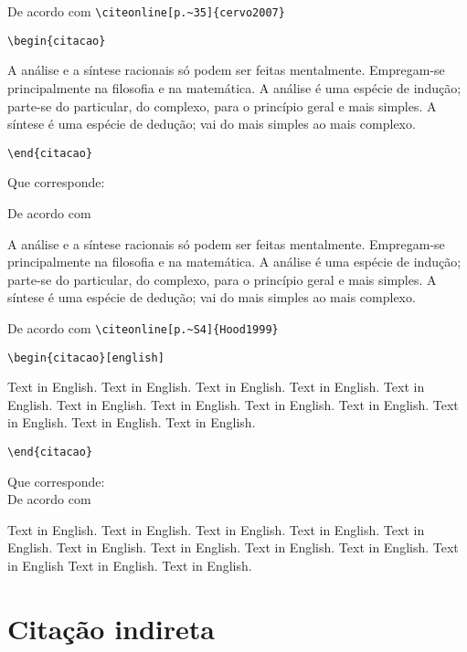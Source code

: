 \begin{alineas} 

\item 
De acordo com \verb+\citeonline[p.~35]{cervo2007}+

\verb+\begin{citacao}+

A análise e a síntese racionais só podem ser feitas mentalmente. Empregam-se principalmente na filosofia e na matemática. A análise é uma espécie de indução; parte-se do particular, do complexo, para o princípio geral e mais simples. A síntese é uma espécie de dedução; vai do mais simples ao mais complexo.

\verb+\end{citacao}+

Que corresponde: 

De acordo com 

\begin{citacao}
A análise e a síntese racionais só podem ser feitas mentalmente. Empregam-se principalmente na filosofia e na matemática. A análise é uma espécie de indução; parte-se do particular, do complexo, para o princípio geral e mais simples. A síntese é uma espécie de dedução; vai do mais simples ao mais complexo.
\end{citacao}

\item
De acordo com \verb+\citeonline[p.~S4]{Hood1999}+

\verb+\begin{citacao}[english]+

Text in English. Text in English. Text in English. Text in
English. Text in English. Text in English. Text in English. 
Text in English. Text in English. Text in English. Text in
English. Text in English.

\verb+\end{citacao}+

Que corresponde: \\

 De acordo com 
\begin{citacao}[english]
	Text in English. Text in English. Text in English. Text in English. Text in English. Text in English. Text in English. Text in English. Text in English. Text in English Text in English. Text in English.
\end{citacao}

\end{alineas}

\section{Citação indireta}

